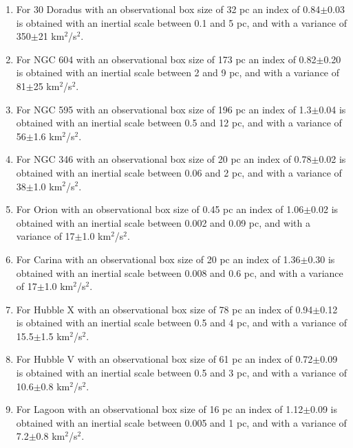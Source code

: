 \documentclass[fleqn,usenatbib, useAMS, a4paper]{mnras}
\begin{document}
\begin{enumerate}
\item For 30 Doradus with an observational box size of 32 pc an index of 0.84$\pm$0.03 is obtained with an inertial scale between 0.1 and 5 pc, and with a variance of 350$\pm$21 km$^2$/s$^2$. 
    
\item For NGC 604 with an observational box size of 173 pc an index of 0.82$\pm$0.20 is obtained with an inertial scale between 2 and 9 pc, and with a variance of 81$\pm$25 km$^2$/s$^2$.
    
\item For NGC 595 with an observational box size of 196 pc an index of 1.3$\pm$0.04 is obtained with an inertial scale between 0.5 and 12 pc, and with a variance of 56$\pm$1.6 km$^2$/s$^2$.

\item For NGC 346 with an observational box size of 20 pc an index of 0.78$\pm$0.02 is obtained with an inertial scale between 0.06 and 2 pc, and with a variance of 38$\pm$1.0 km$^2$/s$^2$.

\item For Orion with an observational box size of 0.45 pc an index of 1.06$\pm$0.02 is obtained with an inertial scale between 0.002 and 0.09 pc, and with a variance of 17$\pm$1.0 km$^2$/s$^2$.

\item For Carina with an observational box size of 20 pc an index of 1.36$\pm$0.30 is obtained with an inertial scale between 0.008 and 0.6 pc, and with a variance of 17$\pm$1.0 km$^2$/s$^2$.

\item For Hubble X with an observational box size of 78 pc an index of 0.94$\pm$0.12 is obtained with an inertial scale between 0.5 and 4 pc, and with a variance of 15.5$\pm$1.5 km$^2$/s$^2$.

\item For Hubble V with an observational box size of 61 pc an index of 0.72$\pm$0.09 is obtained with an inertial scale between 0.5 and 3 pc, and with a variance of 10.6$\pm$0.8 km$^2$/s$^2$.

\item For Lagoon with an observational box size of 16 pc an index of 1.12$\pm$0.09 is obtained with an inertial scale between 0.005 and 1 pc, and with a variance of 7.2$\pm$0.8 km$^2$/s$^2$.


    
\end{enumerate}
\end{document}
